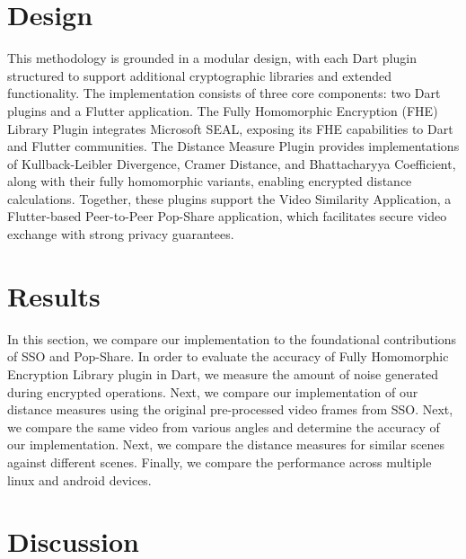 \documentclass [11pt, proquest] {uwthesis}[2020/02/24]
\begin{document}
 
\chapter{Design}

This methodology is grounded in a modular design, with each Dart plugin structured to support additional cryptographic libraries and extended functionality. The implementation consists of three core components: two Dart plugins and a Flutter application. The Fully Homomorphic Encryption (FHE) Library Plugin integrates Microsoft SEAL, exposing its FHE capabilities to Dart and Flutter communities. The Distance Measure Plugin provides implementations of Kullback-Leibler Divergence, Cramer Distance, and Bhattacharyya Coefficient, along with their fully homomorphic variants, enabling encrypted distance calculations. Together, these plugins support the Video Similarity Application, a Flutter-based Peer-to-Peer Pop-Share application, which facilitates secure video exchange with strong privacy guarantees.






\chapter{Results}

In this section, we compare our implementation to the foundational contributions of SSO and Pop-Share. In order to evaluate the accuracy of Fully Homomorphic Encryption Library plugin in Dart, we measure the amount of noise generated during encrypted operations. Next, we compare our implementation of our distance measures using the original pre-processed video frames from SSO. Next, we compare the same video from various angles and determine the accuracy of our implementation. Next, we compare the distance measures for similar scenes against different scenes. Finally, we compare the performance across multiple linux and android devices.








\chapter{Discussion}
\end{document}
